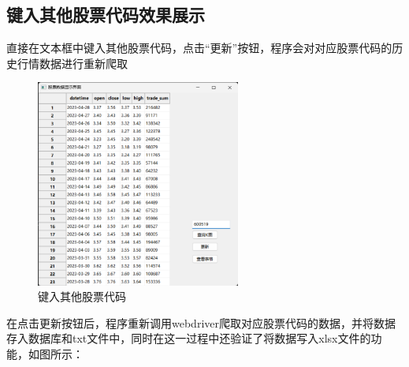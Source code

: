 \documentclass[UTF8,12pt]{article}
\begin{document}
\subsection{键入其他股票代码效果展示}
直接在文本框中键入其他股票代码，点击“更新”按钮，程序会对对应股票代码的历史行情数据进行重新爬取
\begin{figure}[htbp]
    \centering
    \includegraphics[width=0.6\textwidth]{img/15.png}
    \caption{键入其他股票代码}
\end{figure}

在点击更新按钮后，程序重新调用webdriver爬取对应股票代码的数据，并将数据存入数据库和txt文件中，同时在这一过程中还验证了将数据写入xlsx文件的功能，如图所示：
\end{document}

